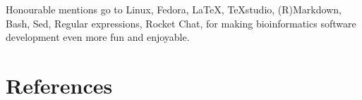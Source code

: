 Honourable mentions go to Linux, Fedora, \LaTeX, TeXstudio, (R)Markdown, Bash, Sed, Regular expressions, Rocket Chat, for making bioinformatics software development even more fun and enjoyable.



\clearpage
\section{References}
\printbibliography[heading=none]
